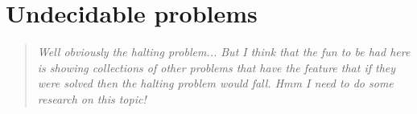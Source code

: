 \section{Undecidable problems}
\begin{quotation}\textit{
Well obviously the halting problem... But I think that the
fun to be had here is showing collections of other problems that
have the feature that if they were solved then the halting problem
would fall. Hmm I need to do some research on this topic!
}\end{quotation}

